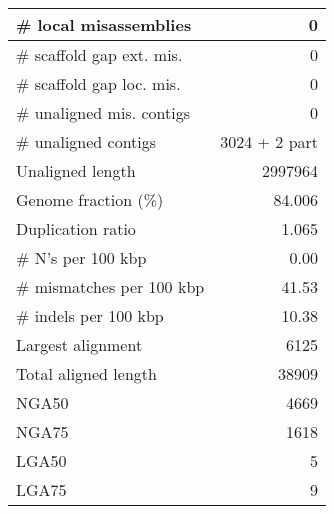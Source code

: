 \documentclass[12pt,a4paper]{article}
\begin{document}
\begin{table}[ht]
\begin{center}
\begin{tabular}{|l*{1}{|r}|}
\# local misassemblies & 0 \\ \hline
\# scaffold gap ext. mis. & 0 \\ \hline
\# scaffold gap loc. mis. & 0 \\ \hline
\# unaligned mis. contigs & 0 \\ \hline
\# unaligned contigs & 3024 + 2 part \\ \hline
Unaligned length & 2997964 \\ \hline
Genome fraction (\%) & 84.006 \\ \hline
Duplication ratio & 1.065 \\ \hline
\# N's per 100 kbp & 0.00 \\ \hline
\# mismatches per 100 kbp & 41.53 \\ \hline
\# indels per 100 kbp & 10.38 \\ \hline
Largest alignment & 6125 \\ \hline
Total aligned length & 38909 \\ \hline
NGA50 & 4669 \\ \hline
NGA75 & 1618 \\ \hline
LGA50 & 5 \\ \hline
LGA75 & 9 \\ \hline
\end{tabular}
\end{center}
\end{table}
\end{document}
